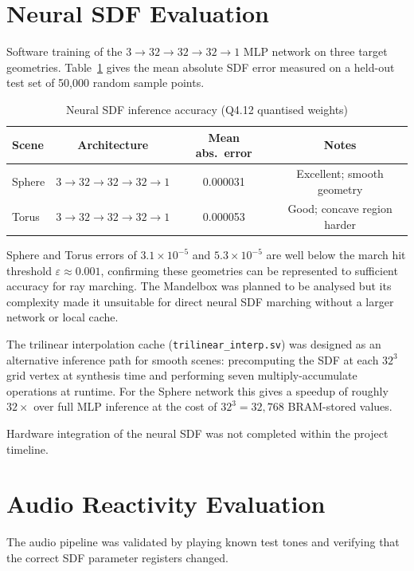 \section{Neural SDF Evaluation}

Software training of the $3{\to}32{\to}32{\to}32{\to}1$ MLP network on three target
geometries. Table~\ref{tab:neural-eval} gives the mean absolute SDF error
measured on a held-out test set of 50{,}000 random sample points.

\begin{table}[h!]
\centering
\small
\caption{Neural SDF inference accuracy (Q4.12 quantised weights)}
\label{tab:neural-eval}
{\renewcommand{\arraystretch}{1.4}
\begin{tabular}{l c c c}
\toprule
\textbf{Scene} & \textbf{Architecture} & \textbf{Mean abs.\ error} & \textbf{Notes} \\
\midrule
Sphere    & $3{\to}32{\to}32{\to}32{\to}1$ & 0.000031 & Excellent; smooth geometry \\
Torus     & $3{\to}32{\to}32{\to}32{\to}1$ & 0.000053 & Good; concave region harder \\
\bottomrule
\end{tabular}}
\end{table}

Sphere and Torus errors of $3.1\times10^{-5}$ and $5.3\times10^{-5}$ are
well below the march hit threshold $\varepsilon \approx 0.001$, confirming
these geometries can be represented to sufficient accuracy for ray marching.
The Mandelbox was planned to be analysed but its complexity made
it unsuitable for direct neural SDF marching without a larger network or
local cache.

The trilinear interpolation cache (\texttt{trilinear\_interp.sv}) was
designed as an alternative inference path for smooth scenes: precomputing the
SDF at each $32^3$ grid vertex at synthesis time and performing seven
multiply-accumulate operations at runtime. For the Sphere network this gives
a speedup of roughly $32\times$ over full MLP inference at the cost of
$32^3 = 32{,}768$ BRAM-stored values.

Hardware integration of the neural SDF was not completed within the project
timeline.

\section{Audio Reactivity Evaluation}

The audio pipeline was validated by playing known test tones and verifying
that the correct SDF parameter registers changed.

